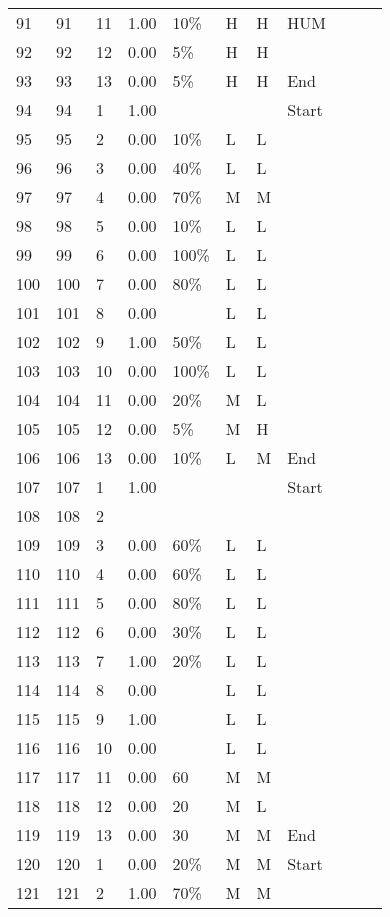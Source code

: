 \begin{longtable}{lllllllllll}
  91 &  91 &  11 & 1.00 & 10\% & H & H & HUM \\ 
  92 &  92 &  12 & 0.00 & 5\% & H & H &  \\ 
  93 &  93 &  13 & 0.00 & 5\% & H & H & End \\ 
  94 &  94 &   1 & 1.00 &  &  &  & Start \\ 
  95 &  95 &   2 & 0.00 & 10\% & L & L &  \\ 
  96 &  96 &   3 & 0.00 & 40\% & L & L &  \\ 
  97 &  97 &   4 & 0.00 & 70\% & M & M &  \\ 
  98 &  98 &   5 & 0.00 & 10\% & L & L &  \\ 
  99 &  99 &   6 & 0.00 & 100\% & L & L &  \\ 
  100 & 100 &   7 & 0.00 & 80\% & L & L &  \\ 
  101 & 101 &   8 & 0.00 &  & L & L &  \\ 
  102 & 102 &   9 & 1.00 & 50\% & L & L &  \\ 
  103 & 103 &  10 & 0.00 & 100\% & L & L &  \\ 
  104 & 104 &  11 & 0.00 & 20\% & M & L &  \\ 
  105 & 105 &  12 & 0.00 & 5\% & M & H &  \\ 
  106 & 106 &  13 & 0.00 & 10\% & L & M & End \\ 
  107 & 107 &   1 & 1.00 &  &  &  & Start \\ 
  108 & 108 &   2 &  &  &  &  &  \\ 
  109 & 109 &   3 & 0.00 & 60\% & L & L &  \\ 
  110 & 110 &   4 & 0.00 & 60\% & L & L &  \\ 
  111 & 111 &   5 & 0.00 & 80\% & L & L &  \\ 
  112 & 112 &   6 & 0.00 & 30\% & L & L &  \\ 
  113 & 113 &   7 & 1.00 & 20\% & L & L &  \\ 
  114 & 114 &   8 & 0.00 &  & L & L &  \\ 
  115 & 115 &   9 & 1.00 &  & L & L &  \\ 
  116 & 116 &  10 & 0.00 &  & L & L &  \\ 
  117 & 117 &  11 & 0.00 & 60 & M & M &  \\ 
  118 & 118 &  12 & 0.00 & 20 & M & L &  \\ 
  119 & 119 &  13 & 0.00 & 30 & M & M & End \\ 
  120 & 120 &   1 & 0.00 & 20\% & M & M & Start \\ 
  121 & 121 &   2 & 1.00 & 70\% & M & M &  \\ 

\end{longtable}
